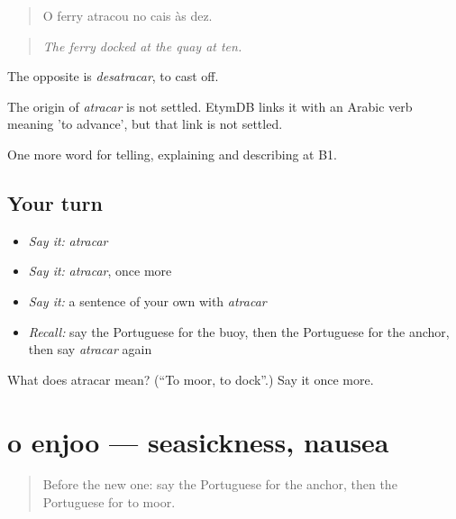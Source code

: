 \begin{quote}
O ferry atracou no cais às dez.
\end{quote}

\begin{quote}
\emph{The ferry docked at the quay at ten.}
\end{quote}

The opposite is \emph{desatracar}, to cast off.

\begin{cousinweb}
The origin of \emph{atracar} is not settled. EtymDB links it with an Arabic verb meaning 'to advance', but that link is not settled.
\end{cousinweb}

\begin{grammarlens}[title={What you've built}]
One more word for telling, explaining and describing at B1.
\end{grammarlens}

\subsection*{Your turn}
\begin{itemize}
\raggedright
  \item \emph{Say it:} \emph{atracar}
  \item \emph{Say it:} \emph{atracar}, once more
  \item \emph{Say it:} a sentence of your own with \emph{atracar}
  \item \emph{Recall:} say the Portuguese for the buoy, then the Portuguese for the anchor, then say \emph{atracar} again
\end{itemize}

\begin{tcolorbox}[breakable,colback=teal!4,colframe=teal!35!black,title={Before you move on}]
What does atracar mean? (\textquotedblleft{}To moor, to dock\textquotedblright{}.) Say it once more.
\end{tcolorbox}
\section[o enjoo]{o enjoo — seasickness, nausea}

\label{lesson:PT-C420-enjoo}



\begin{quote}
Before the new one: say the Portuguese for the anchor, then the Portuguese for to moor.
\end{quote}

